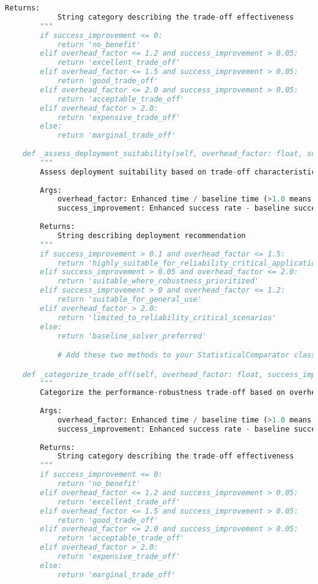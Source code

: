 \begin{lstlisting}[language=Python, caption=Statistical Analysis and Comparison Framework]
        Returns:
            String category describing the trade-off effectiveness
        """
        if success_improvement <= 0:
            return 'no_benefit'
        elif overhead_factor <= 1.2 and success_improvement > 0.05:
            return 'excellent_trade_off'
        elif overhead_factor <= 1.5 and success_improvement > 0.05:
            return 'good_trade_off'
        elif overhead_factor <= 2.0 and success_improvement > 0.05:
            return 'acceptable_trade_off'
        elif overhead_factor > 2.0:
            return 'expensive_trade_off'
        else:
            return 'marginal_trade_off'
    
    def _assess_deployment_suitability(self, overhead_factor: float, success_improvement: float) -> str:
        """
        Assess deployment suitability based on trade-off characteristics.
        
        Args:
            overhead_factor: Enhanced time / baseline time (>1.0 means slower)
            success_improvement: Enhanced success rate - baseline success rate
            
        Returns:
            String describing deployment recommendation
        """
        if success_improvement > 0.1 and overhead_factor <= 1.5:
            return 'highly_suitable_for_reliability_critical_applications'
        elif success_improvement > 0.05 and overhead_factor <= 2.0:
            return 'suitable_where_robustness_prioritized'
        elif success_improvement > 0 and overhead_factor <= 1.2:
            return 'suitable_for_general_use'
        elif overhead_factor > 2.0:
            return 'limited_to_reliability_critical_scenarios'
        else:
            return 'baseline_solver_preferred'

            # Add these two methods to your StatisticalComparator class in app_1.tex

    def _categorize_trade_off(self, overhead_factor: float, success_improvement: float) -> str:
        """
        Categorize the performance-robustness trade-off based on overhead and robustness gains.
        
        Args:
            overhead_factor: Enhanced time / baseline time (>1.0 means slower)
            success_improvement: Enhanced success rate - baseline success rate
            
        Returns:
            String category describing the trade-off effectiveness
        """
        if success_improvement <= 0:
            return 'no_benefit'
        elif overhead_factor <= 1.2 and success_improvement > 0.05:
            return 'excellent_trade_off'
        elif overhead_factor <= 1.5 and success_improvement > 0.05:
            return 'good_trade_off'
        elif overhead_factor <= 2.0 and success_improvement > 0.05:
            return 'acceptable_trade_off'
        elif overhead_factor > 2.0:
            return 'expensive_trade_off'
        else:
            return 'marginal_trade_off'
    

\end{lstlisting}
